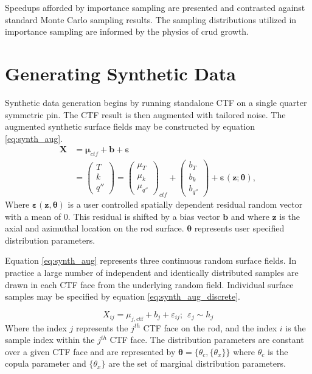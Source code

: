 Speedups afforded by importance sampling are presented and contrasted against standard Monte Carlo sampling results.  The sampling distributions utilized in importance sampling are informed by the physics of crud growth.

\section{Generating Synthetic Data}

Synthetic data generation begins by running standalone CTF on a single quarter symmetric pin.   The CTF result is then augmented with tailored noise.  The augmented synthetic surface fields may be constructed by equation \ref{eq:synth_aug}.
\begin{align}
    \bm X &= \bm \mu_{ctf} + \bm b + \bm \varepsilon \nonumber \\
          &=
    \begin{pmatrix}
        T \\
        k \\
        q''
    \end{pmatrix}
    =
    \begin{pmatrix}
        \mu_{T} \\
        \mu_k \\
        \mu_{q''}
    \end{pmatrix}_{ctf}
    + \begin{pmatrix}
        b_{T} \\
        b_k \\
        b_{q''}
    \end{pmatrix}
    + \bm{\varepsilon} (\mathbf z; \bm \theta),
\label{eq:synth_aug}
\end{align}
Where $\bm \varepsilon(\mathbf z, \bm \theta)$ is a user controlled spatially dependent residual random vector with a mean of 0.  This residual is
shifted by a bias vector
$\mathbf b$ and where $\mathbf z$ is the axial and azimuthal location on the rod surface.
$\bm \theta$ represents user specified distribution parameters.

Equation \ref{eq:synth_aug} represents three continuous random surface fields.  In practice a large number of independent and identically distributed samples are drawn in each CTF face from the underlying random field.  Individual surface samples may be specified by equation \ref{eq:synth_aug_discrete}.

\begin{equation}
    X_{ij} = \mu_{j,\mathrm{ctf}} + b_j + \varepsilon_{ij};\ \   \varepsilon_{j} \sim h_j
    \label{eq:synth_aug_discrete}
\end{equation}
Where the index $j$ represents the $j^{th}$ CTF face on the rod, and the index $i$ is the sample index within the $j^{th}$ CTF face.  The distribution parameters are constant over a given CTF face and are represented by $\bm \theta = \{\theta_c, \{\theta_x\}\}$ where $\theta_c$ is the copula parameter and  $\{\theta_x\}$ are the set of marginal distribution parameters.

